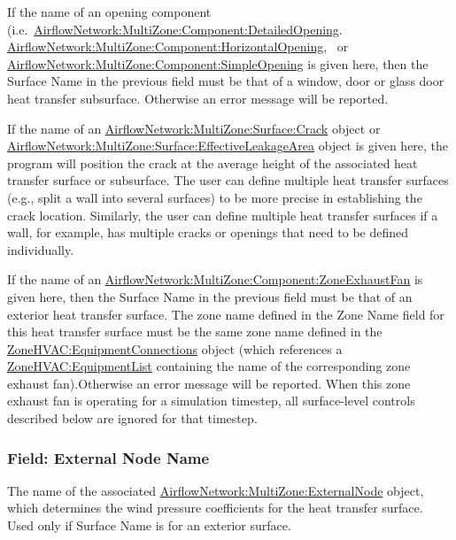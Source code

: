 If the name of an opening component (i.e.~\hyperref[airflownetworkmultizonecomponentdetailedopening]{AirflowNetwork:MultiZone:Component:DetailedOpening}. \hyperref[airflownetworkmultizonecomponenthorizontalopening]{AirflowNetwork:MultiZone:Component:HorizontalOpening},~ or \hyperref[airflownetworkmultizonecomponentsimpleopening]{AirflowNetwork:MultiZone:Component:SimpleOpening} is given here, then the Surface Name in the previous field must be that of a window, door or glass door heat transfer subsurface. Otherwise an error message will be reported.

If the name of an \hyperref[airflownetworkmultizonesurfacecrack]{AirflowNetwork:MultiZone:Surface:Crack} object or \hyperref[airflownetworkmultizonesurfaceeffectiveleakagearea]{AirflowNetwork:MultiZone:Surface:EffectiveLeakageArea} object is given here, the program will position the crack at the average height of the associated heat transfer surface or subsurface. The user can define multiple heat transfer surfaces (e.g., split a wall into several surfaces) to be more precise in establishing the crack location. Similarly, the user can define multiple heat transfer surfaces if a wall, for example, has multiple cracks or openings that need to be defined individually.

If the name of an \hyperref[airflownetworkmultizonecomponentzoneexhaustfan]{AirflowNetwork:MultiZone:Component:ZoneExhaustFan} is given here, then the Surface Name in the previous field must be that of an exterior heat transfer surface. The zone name defined in the Zone Name field for this heat transfer surface must be the same zone name defined in the \hyperref[zonehvacequipmentconnections]{ZoneHVAC:EquipmentConnections} object (which references a \hyperref[zonehvacequipmentlist]{ZoneHVAC:EquipmentList} containing the name of the corresponding zone exhaust fan).Otherwise an error message will be reported. When this zone exhaust fan is operating for a simulation timestep, all surface-level controls described below are ignored for that timestep.

\subsubsection{Field: External Node Name}\label{field-external-node-name}

The name of the associated \hyperref[airflownetworkmultizoneexternalnode]{AirflowNetwork:MultiZone:ExternalNode} object, which
determines the wind pressure coefficients for the heat transfer surface. Used
only if Surface Name is for an exterior surface.

